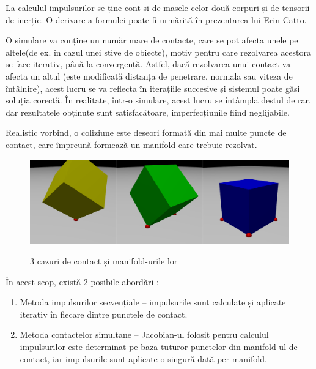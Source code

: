 \documentclass[12pt,a4paper]{report}
\begin{document}
La calculul impulsurilor se ține cont și de masele celor două corpuri și de tensorii de inerție. O derivare a formulei poate fi urmărită în prezentarea lui Erin Catto\cite{constraints_catto}.

O simulare va conține un număr mare de contacte, care se pot afecta unele pe altele(de ex. în cazul unei stive de obiecte), motiv pentru care rezolvarea acestora se face iterativ, până la convergență. Astfel, dacă rezolvarea unui contact va afecta un altul (este modificată distanța de penetrare, normala sau viteza de întâlnire), acest lucru se va reflecta în iterațiile succesive și sistemul poate găsi soluția corectă. În realitate, într-o simulare, acest lucru se întâmplă destul de rar, dar rezultatele obținute sunt satisfăcătoare, imperfecțiunile fiind neglijabile.

Realistic vorbind, o coliziune este deseori formată din mai multe puncte de contact, care împreună formează un manifold care trebuie rezolvat.
\begin{figure}[H]
	\centering
	\includegraphics[width=0.7\linewidth]{pics/cap3_03.png}
	\label{fig:cap3_03}
	\caption[]{3 cazuri de contact și manifold-urile lor}
\end{figure}
În acest scop, există 2 posibile abordări \cite[Secțiunea 6.6.2~\textit{Collision response for colliding contact}]{game_physics_eberly}:
\begin{enumerate}
	\item Metoda impulsurilor secvențiale -- impulsurile sunt calculate și aplicate iterativ în fiecare dintre punctele de contact.
	\item Metoda contactelor simultane -- Jacobian-ul folosit pentru calculul impulsurilor este determinat pe baza tuturor punctelor din manifold-ul de contact, iar impulsurile sunt aplicate o singură dată per manifold.
\end{enumerate}
\end{document}
